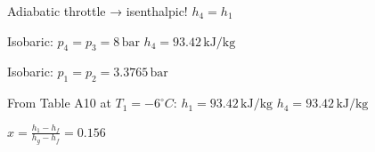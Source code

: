 Adiabatic throttle → isenthalpic!  
\( h_4 = h_1 \)  

Isobaric: \( p_4 = p_3 = 8 \, \text{bar} \)  
\( h_4 = 93.42 \, \text{kJ/kg} \)  

Isobaric: \( p_1 = p_2 = 3.3765 \, \text{bar} \)  

From Table A10 at \( T_1 = -6^\circ C \):  
\( h_1 = 93.42 \, \text{kJ/kg} \)  
\( h_4 = 93.42 \, \text{kJ/kg} \)  

\( x = \frac{h_1 - h_f}{h_g - h_f} = 0.156 \)